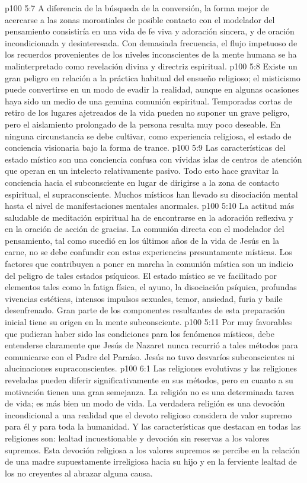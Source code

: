 \vs p100 5:7 \pc A diferencia de la búsqueda de la conversión, la forma mejor de acercarse a las zonas morontiales de posible contacto con el modelador del pensamiento consistiría en una vida de fe viva y adoración sincera, y de oración incondicionada y desinteresada. Con demasiada frecuencia, el flujo impetuoso de los recuerdos provenientes de los niveles inconscientes de la mente humana se ha malinterpretado como revelación divina y directriz espiritual.
\vs p100 5:8 Existe un gran peligro en relación a la práctica habitual del ensueño religioso; el misticismo puede convertirse en un modo de evadir la realidad, aunque en algunas ocasiones haya sido un medio de una genuina comunión espiritual. Temporadas cortas de retiro de los lugares ajetreados de la vida pueden no suponer un grave peligro, pero el aislamiento prolongado de la persona resulta muy poco deseable. En ninguna circunstancia se debe cultivar, como experiencia religiosa, el estado de conciencia visionaria bajo la forma de trance.
\vs p100 5:9 Las características del estado místico son una conciencia confusa con vívidas islas de centros de atención que operan en un intelecto relativamente pasivo. Todo esto hace gravitar la conciencia hacia el subconsciente en lugar de dirigirse a la zona de contacto espiritual, el supraconsciente. Muchos místicos han llevado su disociación mental hasta el nivel de manifestaciones mentales anormales.
\vs p100 5:10 La actitud más saludable de meditación espiritual ha de encontrarse en la adoración reflexiva y en la oración de acción de gracias. La comunión directa con el modelador del pensamiento, tal como sucedió en los últimos años de la vida de Jesús en la carne, no se debe confundir con estas experiencias presuntamente místicas. Los factores que contribuyen a poner en marcha la comunión mística son un indicio del peligro de tales estados psíquicos. El estado místico se ve facilitado por elementos tales como la fatiga física, el ayuno, la disociación psíquica, profundas vivencias estéticas, intensos impulsos sexuales, temor, ansiedad, furia y baile desenfrenado. Gran parte de los componentes resultantes de esta preparación inicial tiene su origen en la mente subconsciente.
\vs p100 5:11 Por muy favorables que pudieran haber sido las condiciones para los fenómenos místicos, debe entenderse claramente que Jesús de Nazaret nunca recurrió a tales métodos para comunicarse con el Padre del Paraíso. Jesús no tuvo desvaríos subconscientes ni alucinaciones supraconscientes.
\vs p100 6:1 Las religiones evolutivas y las religiones reveladas pueden diferir significativamente en sus métodos, pero en cuanto a su motivación tienen una gran semejanza. La religión no es una determinada tarea de vida; es más bien un modo de vida. La verdadera religión es una devoción incondicional a una realidad que el devoto religioso considera de valor supremo para él y para toda la humanidad. Y las características que destacan en todas las religiones son: lealtad incuestionable y devoción sin reservas a los valores supremos. Esta devoción religiosa a los valores supremos se percibe en la relación de una madre supuestamente irreligiosa hacia su hijo y en la ferviente lealtad de los no creyentes al abrazar alguna causa.
